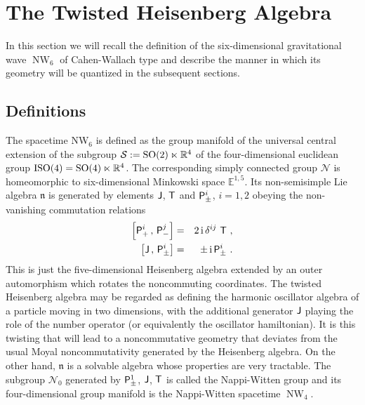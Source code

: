 \documentclass[11pt,a4paper]{article}
\DeclareMathOperator{\NW}{NW}
\def\ii{{\,{\rm i}\,}}
\def\P{{\sf P}}
\def\T{{\sf T}}
\def\J{{\sf J}}
\newcommand{\newsection}{\setcounter{equation}{0}\section}
\newcommand{\real}{{\mathbb R}} %
\newcommand{\eucl}{{\mathbb E}}
\def\nn{\nonumber}
\def\bea{\begin{eqnarray}}
\def\eea{\end{eqnarray}}
\begin{document}
\newsection{The Twisted Heisenberg Algebra\label{TTHA}}

In this section we will recall the definition of the six-dimensional
gravitational wave $\NW_6$ of Cahen-Wallach type and describe the
manner in which its geometry will be quantized in the subsequent
sections.

\subsection{Definitions \label{Defs}}

The spacetime NW$_6$ is defined as the group manifold of
the universal central extension of the subgroup
$\mathcal{S}:={\rm SO}(2)\ltimes\real^4$ of the four-dimensional
euclidean group ${\rm ISO}(4)={\rm
  SO}(4)\ltimes\real^4$. The corresponding simply connected group
$\mathcal N$ is homeomorphic to six-dimensional Minkowski space
$\eucl^{1,5}$. Its non-semisimple Lie algebra $\mathfrak n$ is
generated by elements $\J$, $\T$ and $\P^i_\pm$, $i=1,2$ obeying the
non-vanishing commutation relations
\bea
\left[\P^i_+\,,\,\P^j_-\right]&=&2\ii\delta^{ij}~\T \ , \nn\\
\left[\J\,,\,\P^i_\pm\right]&=&\pm\ii\P^i_\pm \ .
\label{NW4algdef}\eea
This is just the five-dimensional Heisenberg algebra extended by an
outer automorphism which rotates the noncommuting coordinates. The
twisted Heisenberg algebra
may be regarded as defining the harmonic oscillator algebra of a
particle moving in two dimensions, with the additional generator $\J$
playing the role of the number operator (or equivalently the
oscillator hamiltonian). It is this twisting that will
lead to a noncommutative geometry that deviates from the usual Moyal
noncommutativity generated by the Heisenberg algebra. On the other
hand, $\mathfrak{n}$ is a solvable algebra whose properties are very
tractable. The subgroup $\mathcal{N}_0$ generated by $\P^1_\pm$, $\J$,
$\T$ is called the Nappi-Witten group and its four-dimensional group
manifold is the Nappi-Witten spacetime $\NW_4$.
\end{document}
